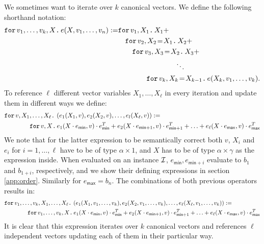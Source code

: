 We sometimes want to iterate over $k$ canonical vectors. We define the following shorthand notation:
\begin{align*}
  \ffor{v_1,\ldots, v_k}{X}{e(X,v_1,\ldots, v_n)}:= &\ffor{v_1}{X_1}{X_1 +} \\
  &\hspace{1em}\initf{X_1}{v_2}{X_2}{X_2 + } \\
  &\hspace{2em}\initf{X_2}{v_3}{X_3}{X_3 + } \\
  &\hspace{8em}\ddots \\
  &\hspace{4em}\initf{X_{k-1}}{v_k}{X_k}{ e(X_k,v_1,\ldots, v_k)}.
\end{align*}
To reference $\ell$ different vector variables $X_1,\ldots,X_\ell$ in every iteration and update them in different ways we define:
\begin{align*}
&\ffor{v}{X_1,\ldots, X_\ell}{\left( e_1(X_1,v), e_2(X_2,v), \ldots, e_l(X_\ell,v) \right)} :=\\
&\hspace{4em}\ffor{v}{X}{e_1(X\cdot e_{\mathsf{min}},v)\cdot e_{\mathsf{min}}^T + e_2(X\cdot e_{\mathsf{min} + 1},v)\cdot e_{\mathsf{min} + 1}^T + \ldots + e_\ell(X\cdot e_{\mathsf{max}},v)\cdot e_{\mathsf{max}}^T}
\end{align*}
We note that for the latter expression to be semantically correct both $v$, $X_i$ and $e_i$ for $ i=1,\ldots,\ell$ have to be of type $\alpha\times 1$, and $X$ has to be of type $\alpha\times\gamma$ as the expression inside. 
When evaluated on an instance $\I$,
$e_{\mathsf{min}}, e_{\mathsf{min} + i}$ evaluate to $b_1$ and $b_{1+i}$, respectively, and we show their defining expressions in section \ref{app:order}. Similarly for $e_{\mathsf{max}}=b_n$.
The combinations of both previous operators results in:
\begin{align*}
&\ffor{v_1,\ldots, v_k}{X_1,\ldots, X_\ell}{\left( e_1(X_1,v_1,\ldots, v_k), e_2(X_2,v_1,\ldots, v_k), \ldots, e_\ell(X_\ell,v_1,\ldots, v_k) \right)} :=\\
&\hspace{4em}\ffor{v_1,\ldots, v_k}{X}{e_1(X\cdot e_{\mathsf{min}},v)\cdot e_{\mathsf{min}}^T + e_2(X\cdot e_{\mathsf{min} + 1},v)\cdot e_{\mathsf{min} + 1}^T + \ldots + e_\ell(X\cdot e_{\mathsf{max}},v)\cdot e_{\mathsf{max}}^T}
\end{align*}
It is clear that this expression iterates over $k$ canonical vectors and references $\ell$ independent vectors updating each of them in their particular way.
